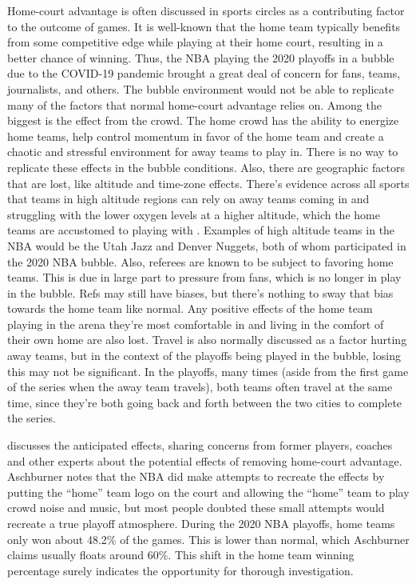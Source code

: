 \documentclass[10pt]{article}
\begin{document}
Home-court advantage is often discussed in sports circles as a contributing
factor to the outcome of games. It is well-known that the home team typically
benefits from some competitive edge while playing at their home court, resulting
in a better chance of winning. Thus, the NBA playing the 2020 playoffs in a
bubble due to the COVID-19 pandemic
brought a great deal of concern for fans, teams, journalists, and others. The bubble
environment would not be able to replicate many of the factors that normal home-court
advantage relies on. Among the biggest is the effect from the crowd. The home crowd has
the ability to energize home teams, help control momentum in favor of the home team and 
create a chaotic and stressful environment for away teams to play in. There is no way
to replicate these effects in the bubble conditions. Also, there are geographic factors
that are lost, like altitude and time-zone effects. There's evidence across all sports
that teams in high altitude regions can rely on away teams coming in and struggling with
the lower oxygen levels at a higher altitude, which the home teams are accustomed to playing
with \citet{Lopez}. Examples of high altitude teams in the NBA would be the Utah Jazz
and Denver Nuggets, both of whom participated in the 2020 NBA bubble. Also, referees 
are known to be subject to favoring home teams. This is due in large part to pressure
from fans, which is no longer in play in the bubble. Refs may still have biases, but 
there's nothing to sway that bias towards the home team like normal. Any positive
effects of the home team playing in the arena they're most comfortable in and
living in the comfort of their own home are also lost. Travel is also normally 
discussed as a factor hurting away teams, but in the context of the playoffs
being played in the bubble, losing this may not be significant. In the playoffs,
many times (aside from the first game of the series when the away team travels), 
both teams often travel at the same time, since they're both going back and forth
between the two cities to complete the series.
 
 \citet{Aschburner} discusses the anticipated effects, sharing
concerns from former players, coaches and other experts about
the potential effects of removing home-court advantage. Aschburner notes that the
NBA did make attempts to recreate the effects by putting the ``home'' team logo on
the court and allowing the ``home'' team to play crowd noise and music, but most
people doubted these small attempts would recreate a true playoff atmosphere.
During the 2020 NBA playoffs, home teams only won about 48.2\% of the games. This
is lower than normal, which Aschburner claims usually floats around 60\%. This
shift in the home team winning percentage surely indicates the opportunity for
thorough investigation.
\end{document}
